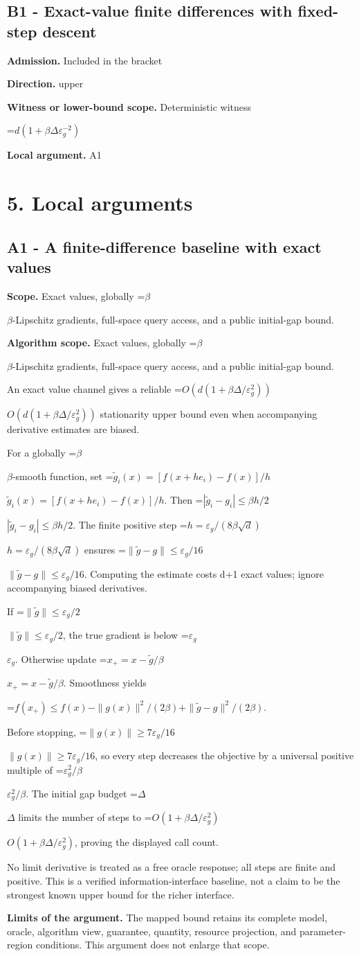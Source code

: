 \documentclass[10pt,a4paper]{article}
\newcommand{\AtlasMath}[1]{\par\begingroup\centering\setbox0=\hbox{$\displaystyle #1$}\ifdim\wd0>1.4\linewidth\typeout{ATLAS WIDE FORMULA: \the\wd0}\fi\ifdim\wd0>\linewidth\resizebox{\linewidth}{!}{\box0}\else\box0\fi\par\endgroup}
\newcommand{\AtlasInlineMath}[1]{\begingroup\setbox0=\hbox{$#1$}\ifdim\wd0>.4\linewidth\endgroup\AtlasMath{#1}\else\endgroup$#1$\fi}
\begin{document}
\subsection{B1 - Exact-value finite differences with fixed-step descent}
\textbf{Admission.} Included in the bracket

\textbf{Direction.} upper

\textbf{Witness or lower-bound scope.} Deterministic witness

\AtlasMath{d(1+\beta\Delta\varepsilon_g^{-2})}
\textbf{Local argument.} A1

\section{5. Local arguments}
\subsection{A1 - A finite-difference baseline with exact values}
\textbf{Scope.} Exact values, globally \AtlasInlineMath{\beta}-Lipschitz gradients, full-space query access, and a public initial-gap bound.

\textbf{Algorithm scope.} Exact values, globally \AtlasInlineMath{\beta}-Lipschitz gradients, full-space query access, and a public initial-gap bound.

An exact value channel gives a reliable \AtlasInlineMath{O(d(1+\beta\Delta/\varepsilon_g^2))} stationarity upper bound even when accompanying derivative estimates are biased.

For a globally \AtlasInlineMath{\beta}-smooth function, set \AtlasInlineMath{\widetilde g_i(x)=[f(x+he_i)-f(x)]/h}. Then \AtlasInlineMath{|\widetilde g_i-g_i|\le\beta h/2}. The finite positive step \AtlasInlineMath{h=\varepsilon_g/(8\beta\sqrt d)} ensures \AtlasInlineMath{\|\widetilde g-g\|\le\varepsilon_g/16}. Computing the estimate costs d+1 exact values; ignore accompanying biased derivatives.

If \AtlasInlineMath{\|\widetilde g\|\le\varepsilon_g/2}, the true gradient is below \AtlasInlineMath{\varepsilon_g}. Otherwise update \AtlasInlineMath{x_+=x-\widetilde g/\beta}. Smoothness yields

\AtlasMath{f(x_+)\le f(x)-\|g(x)\|^2/(2\beta)+\|\widetilde g-g\|^2/(2\beta).}

Before stopping, \AtlasInlineMath{\|g(x)\|\ge7\varepsilon_g/16}, so every step decreases the objective by a universal positive multiple of \AtlasInlineMath{\varepsilon_g^2/\beta}. The initial gap budget \AtlasInlineMath{\Delta} limits the number of steps to \AtlasInlineMath{O(1+\beta\Delta/\varepsilon_g^2)}, proving the displayed call count.

No limit derivative is treated as a free oracle response; all steps are finite and positive. This is a verified information-interface baseline, not a claim to be the strongest known upper bound for the richer interface.

\textbf{Limits of the argument.} The mapped bound retains its complete model, oracle, algorithm view, guarantee, quantity, resource projection, and parameter-region conditions. This argument does not enlarge that scope.
\end{document}
